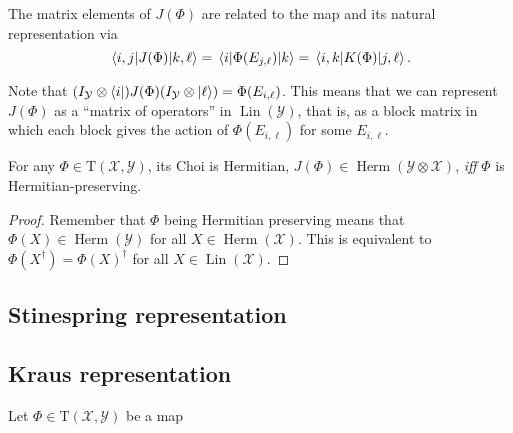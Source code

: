 \documentclass[12pt]{report}
\newcommand{\calY}{{\mathcal{Y}}}
\newcommand{\calX}{{\mathcal{X}}}
\newcommand{\rmT}{{\mathrm{T}}}
\DeclareMathOperator{\Herm}{Herm}
\DeclareMathOperator{\Lin}{Lin}
\begin{document}
\begin{prop}
	The matrix elements of $J(\Phi)$ are related to the map and its natural representation via
	\begin{equation}
		\mel{i,j}{J(\Phi)}{k,\ell}
		= \mel{i}{\Phi(E_{j,\ell})}{k}
		= \mel{i,k}{K(\Phi)}{j,\ell}.
	\end{equation}
\end{prop}

Note that $(I_{\calY}\otimes\bra i)J(\Phi)(I_{\calY}\otimes\ket \ell) = \Phi(E_{i,\ell})$.
This means that we can represent $J(\Phi)$ as a ``matrix of operators'' in $\Lin(\calY)$, that is, as a block matrix in which each block gives the action of $\Phi(E_{i,\ell})$ for some $E_{i,\ell}$.


\begin{prop}
	For any $\Phi\in\rmT(\calX,\calY)$, its Choi is Hermitian,
	$J(\Phi)\in\Herm(\calY\otimes\calX)$, \emph{iff} $\Phi$ is Hermitian-preserving.
\end{prop}
\begin{proof}
	Remember that $\Phi$ being Hermitian preserving means that $\Phi(X)\in\Herm(\calY)$ for all $X\in\Herm(\calX)$.
	This is equivalent to $\Phi(X^\dagger)=\Phi(X)^\dagger$ for all $X\in\Lin(\calX)$.
\end{proof}


\subsection{Stinespring representation}

\subsection{Kraus representation}

\begin{prop}
	Let $\Phi\in\rmT(\calX,\calY)$ be a map 
\end{prop}
\end{document}
